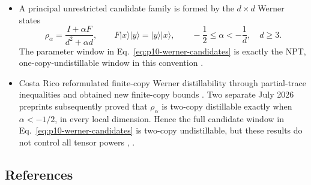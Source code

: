 \begin{itemize}
  \item A principal unrestricted candidate family is formed by the
  $d\times d$ Werner states
  \begin{equation}
    \rho_\alpha=\frac{I+\alpha F}{d^2+\alpha d},
    \qquad
    F\lvert x\rangle\lvert y\rangle
      =\lvert y\rangle\lvert x\rangle,
    \qquad
    -\frac12\leq\alpha<-\frac1d,\quad d\geq3.
    \label{eq:p10-werner-candidates}
  \end{equation}
  The parameter window in Eq.~\eqref{eq:p10-werner-candidates} is exactly the
  NPT, one-copy-undistillable window in this convention
  .

  \newpage
  \item Costa Rico reformulated finite-copy Werner distillability through
  partial-trace inequalities and obtained new finite-copy bounds
  .  Two separate July 2026 preprints
  subsequently proved that $\rho_\alpha$ is two-copy distillable exactly when
  $\alpha<-1/2$, in every local dimension.  Hence the full candidate window
  in Eq.~\eqref{eq:p10-werner-candidates} is two-copy undistillable, but these
  results do not control all tensor powers
  ,
  .
\end{itemize}

\subsection*{References}

